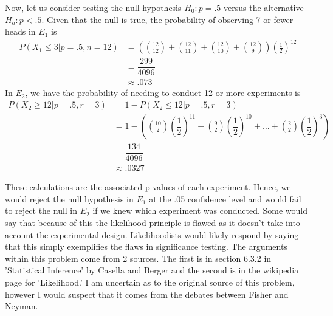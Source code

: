 \documentclass[12pt]{article}\usepackage[]{graphicx}\usepackage[]{color}
\begin{document}
\begin{enumerate}
Now, let us consider testing the null hypothesis $H_0: p = .5$ versus the alternative $H_a: p < .5$. Given that the null is true, the probability of observing 7 or fewer heads in $E_1$ is 
\begin{align*}
P(X_1 \leq 3 | p = .5, n = 12) &= \left ( {12 \choose 12} + {12 \choose 11} +  {12 \choose 10} +  {12 \choose 9}  \right) \left ( \frac{1}{2} \right )^{12} \\
&= \dfrac{299}{4096} \\
&\approx .073
\end{align*}
In $E_2$, we have the probability of needing to conduct 12 or more experiments is
\begin{align*}
P(X_2 \geq 12 | p = .5, r = 3) &= 1 - P(X_2 \leq 12 | p = .5, r = 3)\\
&= 1 - \left ( {10 \choose 2} \left ( \dfrac{1}{2} \right)^{11} + {9 \choose 2} \left ( \dfrac{1}{2} \right)^{10} + \dots + {2 \choose 2} \left ( \dfrac{1}{2} \right)^3  \right )\\
&= \dfrac{134}{4096}\\
& \approx .0327
\end{align*}

These calculations are the associated p-values of each experiment. Hence, we would reject the null hypothesis in $E_1$ at the .05 confidence level and would fail to reject the null in $E_2$ if we knew which experiment was conducted. Some would say that because of this the likelihood principle is flawed as it doesn't take into account the experimental design. Likelihoodists would likely respond by saying that this simply exemplifies the flaws in significance testing. The arguments within this problem come from 2 sources. The first is in section 6.3.2 in 'Statistical Inference' by Casella and Berger and the second is in the wikipedia page for 'Likelihood.' I am uncertain as to the original source of this problem, however I would suspect that it comes from the debates between Fisher and Neyman.


\end{enumerate}
\end{document}
